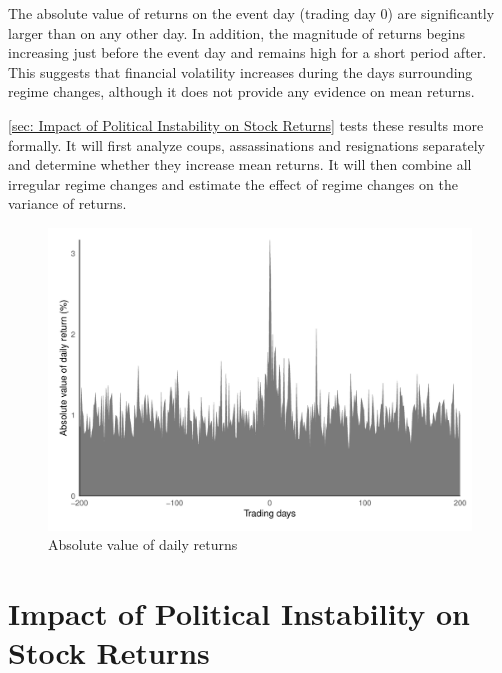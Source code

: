 \documentclass[12pt,final,fleqn]{article}
\theoremstyle{plain}
\begin{document}
The absolute value of returns on the event day (trading day 0) are significantly larger than on any other day. In addition, the magnitude of returns begins increasing just before the event day and remains high for a short period after. This suggests that financial volatility increases during the days surrounding regime changes, although it does not provide any evidence on mean returns.

\autoref{sec: Impact of Political Instability on Stock Returns} tests these results more formally. It will first analyze coups, assassinations and resignations separately and determine whether they increase mean returns. It will then combine all irregular regime changes and estimate the effect of regime changes on the variance of returns.

\begin{figure}[!ht]
\includegraphics{../figs/daily_mean_absreturn.pdf}
\caption{Absolute value of daily returns}
\label{fig:AV-DR}
\end{figure}


\section{Impact of Political Instability on Stock Returns} \label{sec: Impact of Political Instability on Stock Returns}
\end{document}

